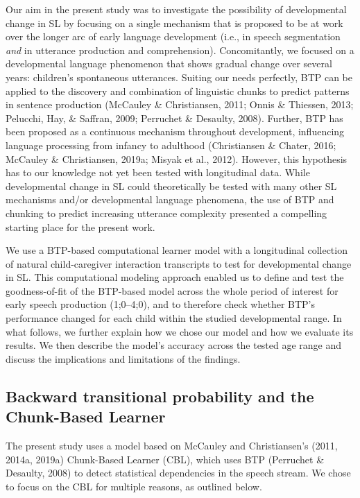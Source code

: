 \documentclass[
  english,
  man,floatsintext]{apa6}
\begin{document}
Our aim in the present study was to investigate the possibility of developmental change in SL by focusing on a single mechanism that is proposed to be at work over the longer arc of early language development (i.e., in speech segmentation \emph{and} in utterance production and comprehension). Concomitantly, we focused on a developmental language phenomenon that shows gradual change over several years: children's spontaneous utterances. Suiting our needs perfectly, BTP can be applied to the discovery and combination of linguistic chunks to predict patterns in sentence production (McCauley \& Christiansen, 2011; Onnis \& Thiessen, 2013; Pelucchi, Hay, \& Saffran, 2009; Perruchet \& Desaulty, 2008). Further, BTP has been proposed as a continuous mechanism throughout development, influencing language processing from infancy to adulthood (Christiansen \& Chater, 2016; McCauley \& Christiansen, 2019a; Misyak et al., 2012). However, this hypothesis has to our knowledge not yet been tested with longitudinal data. While developmental change in SL could theoretically be tested with many other SL mechanisms and/or developmental language phenomena, the use of BTP and chunking to predict increasing utterance complexity presented a compelling starting place for the present work.

We use a BTP-based computational learner model with a longitudinal collection of natural child-caregiver interaction transcripts to test for developmental change in SL. This computational modeling approach enabled us to define and test the goodness-of-fit of the BTP-based model across the whole period of interest for early speech production (1;0--4;0), and to therefore check whether BTP's performance changed for each child within the studied developmental range. In what follows, we further explain how we chose our model and how we evaluate its results. We then describe the model's accuracy across the tested age range and discuss the implications and limitations of the findings.

\hypertarget{backward-transitional-probability-and-the-chunk-based-learner}{%
\subsection{Backward transitional probability and the Chunk-Based Learner}\label{backward-transitional-probability-and-the-chunk-based-learner}}

The present study uses a model based on McCauley and Christiansen's (2011, 2014a, 2019a) Chunk-Based Learner (CBL), which uses BTP (Perruchet \& Desaulty, 2008) to detect statistical dependencies in the speech stream. We chose to focus on the CBL for multiple reasons, as outlined below.
\end{document}
